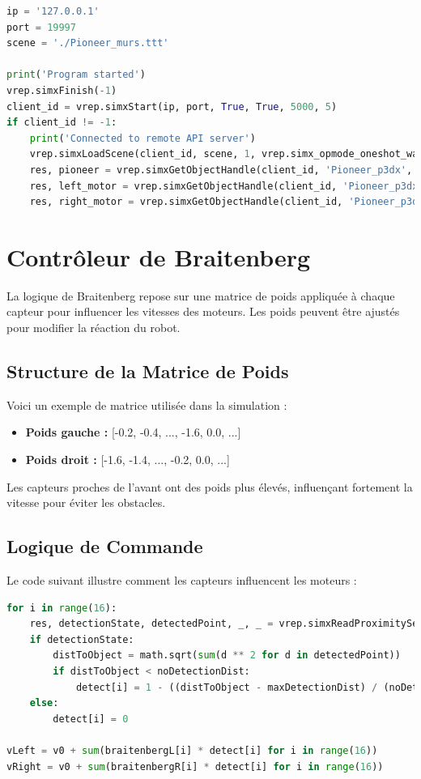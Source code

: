 \documentclass{article}
\begin{document}
\begin{lstlisting}[language=Python, caption=Connexion et configuration de la simulation]
ip = '127.0.0.1'
port = 19997
scene = './Pioneer_murs.ttt'

print('Program started')
vrep.simxFinish(-1)
client_id = vrep.simxStart(ip, port, True, True, 5000, 5)
if client_id != -1:
    print('Connected to remote API server')
    vrep.simxLoadScene(client_id, scene, 1, vrep.simx_opmode_oneshot_wait)
    res, pioneer = vrep.simxGetObjectHandle(client_id, 'Pioneer_p3dx', vrep.simx_opmode_oneshot_wait)
    res, left_motor = vrep.simxGetObjectHandle(client_id, 'Pioneer_p3dx_leftMotor', vrep.simx_opmode_oneshot_wait)
    res, right_motor = vrep.simxGetObjectHandle(client_id, 'Pioneer_p3dx_rightMotor', vrep.simx_opmode_oneshot_wait)
\end{lstlisting}

\section*{Contrôleur de Braitenberg}
La logique de Braitenberg repose sur une matrice de poids appliquée à chaque capteur pour influencer les vitesses des moteurs. Les poids peuvent être ajustés pour modifier la réaction du robot.

\subsection*{Structure de la Matrice de Poids}
Voici un exemple de matrice utilisée dans la simulation :

\begin{itemize}
    \item \textbf{Poids gauche :} [-0.2, -0.4, ..., -1.6, 0.0, ...]
    \item \textbf{Poids droit :} [-1.6, -1.4, ..., -0.2, 0.0, ...]
\end{itemize}

Les capteurs proches de l'avant ont des poids plus élevés, influençant fortement la vitesse pour éviter les obstacles.

\subsection*{Logique de Commande}
Le code suivant illustre comment les capteurs influencent les moteurs :

\begin{lstlisting}[language=Python, caption=Calcul des vitesses des moteurs]
for i in range(16):
    res, detectionState, detectedPoint, _, _ = vrep.simxReadProximitySensor(client_id, int(sensor_handles[i]), vrep.simx_opmode_buffer)
    if detectionState:
        distToObject = math.sqrt(sum(d ** 2 for d in detectedPoint))
        if distToObject < noDetectionDist:
            detect[i] = 1 - ((distToObject - maxDetectionDist) / (noDetectionDist - maxDetectionDist))
    else:
        detect[i] = 0

vLeft = v0 + sum(braitenbergL[i] * detect[i] for i in range(16))
vRight = v0 + sum(braitenbergR[i] * detect[i] for i in range(16))
\end{lstlisting}
\end{document}

